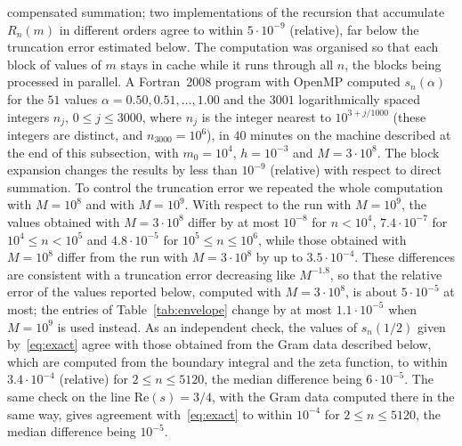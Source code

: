 \documentclass[11pt]{extarticle}
\numberwithin{equation}{section}
\theoremstyle{plain}
\theoremstyle{remark}
\begin{document}
compensated summation; two implementations of the recursion that accumulate $R_n(m)$
in different orders agree to within $5 \cdot 10^{-9}$ (relative), far below the
truncation error estimated below.
The computation was organised so that each block of values of $m$ stays in cache while it
runs through all $n$, the blocks being processed in parallel. A Fortran~2008 program
with OpenMP computed $s_n(\alpha)$ for the $51$ values
$\alpha = 0.50, 0.51, \dots, 1.00$ and the $3001$ logarithmically spaced integers
$n_j$, $0 \leq j \leq 3000$, where $n_j$ is the integer nearest to $10^{3 + j/1000}$
(these integers are distinct, and $n_{3000} = 10^6$), in $40$ minutes on the machine
described at the end of this subsection,
with $m_0 = 10^4$, $h = 10^{-3}$ and $M = 3 \cdot 10^8$.
The block expansion changes the results by less than $10^{-9}$ (relative) with respect
to direct summation. To control the truncation error we repeated the whole
computation with $M = 10^8$ and with $M = 10^9$. With respect to the run with
$M = 10^9$, the values obtained with $M = 3 \cdot 10^8$ differ by at most $10^{-8}$
for $n < 10^4$, $7.4 \cdot 10^{-7}$ for $10^4 \leq n < 10^5$ and $4.8 \cdot 10^{-5}$
for $10^5 \leq n \leq 10^6$, while those obtained with $M = 10^8$ differ from the run
with $M = 3 \cdot 10^8$ by up to $3.5 \cdot 10^{-4}$. These differences are consistent
with a truncation error decreasing like $M^{-1.8}$, so that the relative error of the
values reported below, computed with $M = 3 \cdot 10^8$, is about $5 \cdot 10^{-5}$ at
most; the entries of Table~\ref{tab:envelope} change by at most $1.1 \cdot 10^{-5}$ when
$M = 10^9$ is used instead.
As an independent check, the values of $s_n(1/2)$ given by~\eqref{eq:exact} agree
with those obtained from the Gram data described below, which are computed from the
boundary integral and the zeta function, to within $3.4 \cdot 10^{-4}$ (relative) for
$2 \leq n \leq 5120$, the median difference being $6 \cdot 10^{-5}$. The same check on
the line $\mathrm{Re}(s) = 3/4$, with the Gram data computed there in the same way,
gives agreement with~\eqref{eq:exact} to within $10^{-4}$ for $2 \leq n \leq 5120$, the
median difference being $10^{-5}$.
\end{document}
